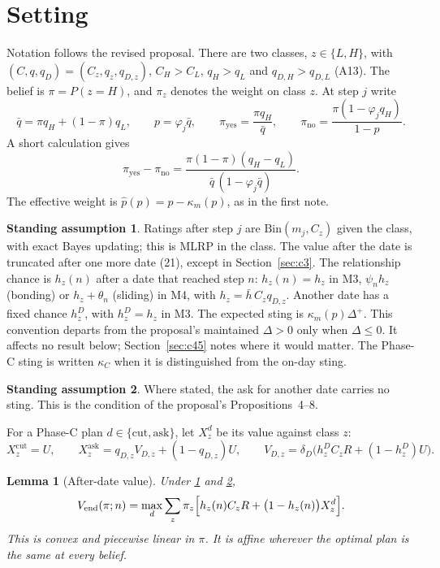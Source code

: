 \documentclass[11pt,a4paper]{article}
\newtheorem{lemma}[theorem]{Lemma}
\theoremstyle{definition}
\newtheorem{assumption}{Standing assumption}
\theoremstyle{remark}
\newcommand{\Vend}{V_{\mathrm{end}}}
\newcommand{\pp}{\hat p}
\newcommand{\py}{\pi_{\mathrm{yes}}}
\newcommand{\pn}{\pi_{\mathrm{no}}}
\newcommand{\qb}{\bar q}
\begin{document}
\section{Setting}\label{sec:setting}

Notation follows the revised proposal. There are two classes, $z\in\{L,H\}$, with $(C,q,q_D)=(C_z,q_z,q_{D,z})$, $C_H>C_L$, $q_H>q_L$ and $q_{D,H}>q_{D,L}$ (A13). The belief is $\pi=P(z=H)$, and $\pi_z$ denotes the weight on class $z$. At step $j$ write
\[
\qb=\pi q_H+(1-\pi)q_L,\qquad p=\varphi_j\qb,\qquad \py=\frac{\pi q_H}{\qb},\qquad \pn=\frac{\pi(1-\varphi_jq_H)}{1-p}.
\]
A short calculation gives
\begin{equation}\label{eq:spread}
\py-\pn=\frac{\pi(1-\pi)(q_H-q_L)}{\qb\,(1-\varphi_j\qb)}.
\end{equation}
The effective weight is $\pp(p)=p-\kappa_m(p)$, as in the first note.

\begin{assumption}\label{S:basic}
Ratings after step $j$ are $\mathrm{Bin}(m_j,C_z)$ given the class, with exact Bayes updating; this is MLRP in the class. The value after the date is truncated after one more date (21), except in Section~\ref{sec:c3}. The relationship chance is $h_z(n)$ after a date that reached step $n$: $h_z(n)=h_z$ in M3, $\psi_nh_z$ (bonding) or $h_z+\theta_n$ (sliding) in M4, with $h_z=\bar h\,C_zq_{D,z}$. Another date has a fixed chance $h^D_z$, with $h^D_z=h_z$ in M3. The expected sting is $\kappa_m(p)\Delta^+$. This convention departs from the proposal's maintained $\Delta>0$ only when $\Delta\le0$. It affects no result below; Section~\ref{sec:c45} notes where it would matter. The Phase-C sting is written $\kappa_C$ when it is distinguished from the on-day sting.
\end{assumption}

\begin{assumption}\label{S:noC}
Where stated, the ask for another date carries no sting. This is the condition of the proposal's Propositions~4--8.
\end{assumption}

For a Phase-C plan $d\in\{\text{cut},\text{ask}\}$, let $X^d_z$ be its value against class $z$:
\[
X^{\text{cut}}_z=U,\qquad X^{\text{ask}}_z=q_{D,z}V_{D,z}+(1-q_{D,z})U,\qquad V_{D,z}=\delta_D\bigl(h^D_zC_zR+(1-h^D_z)U\bigr).
\]

\begin{lemma}[After-date value]\label{lem:vend}
Under \ref{S:basic} and \ref{S:noC},
\[
\Vend(\pi;n)=\max_{d}\sum_z\pi_z\Bigl[h_z(n)C_zR+\bigl(1-h_z(n)\bigr)X^d_z\Bigr].
\]
This is convex and piecewise linear in $\pi$. It is affine wherever the optimal plan is the same at every belief.
\end{lemma}
\end{document}
